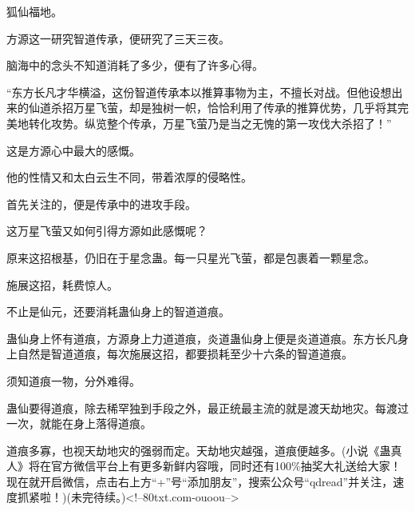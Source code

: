 \begin{this_body}
狐仙福地。

方源这一研究智道传承，便研究了三天三夜。

脑海中的念头不知道消耗了多少，便有了许多心得。

“东方长凡才华横溢，这份智道传承本以推算事物为主，不擅长对战。但他设想出来的仙道杀招万星飞萤，却是独树一帜，恰恰利用了传承的推算优势，几乎将其完美地转化攻势。纵览整个传承，万星飞萤乃是当之无愧的第一攻伐大杀招了！”

这是方源心中最大的感慨。

他的性情又和太白云生不同，带着浓厚的侵略性。

首先关注的，便是传承中的进攻手段。

这万星飞萤又如何引得方源如此感慨呢？

原来这招根基，仍旧在于星念蛊。每一只星光飞萤，都是包裹着一颗星念。

施展这招，耗费惊人。

不止是仙元，还要消耗蛊仙身上的智道道痕。

蛊仙身上怀有道痕，方源身上力道道痕，炎道蛊仙身上便是炎道道痕。东方长凡身上自然是智道道痕，每次施展这招，都要损耗至少十六条的智道道痕。

须知道痕一物，分外难得。

蛊仙要得道痕，除去稀罕独到手段之外，最正统最主流的就是渡天劫地灾。每渡过一次，就能在身上落得道痕。

道痕多寡，也视天劫地灾的强弱而定。天劫地灾越强，道痕便越多。(小说《蛊真人》将在官方微信平台上有更多新鲜内容哦，同时还有100\%抽奖大礼送给大家！现在就开启微信，点击右上方“+”号“添加朋友”，搜索公众号“qdread”并关注，速度抓紧啦！)(未完待续。)<!--80txt.com-ouoou-->

\end{this_body}

